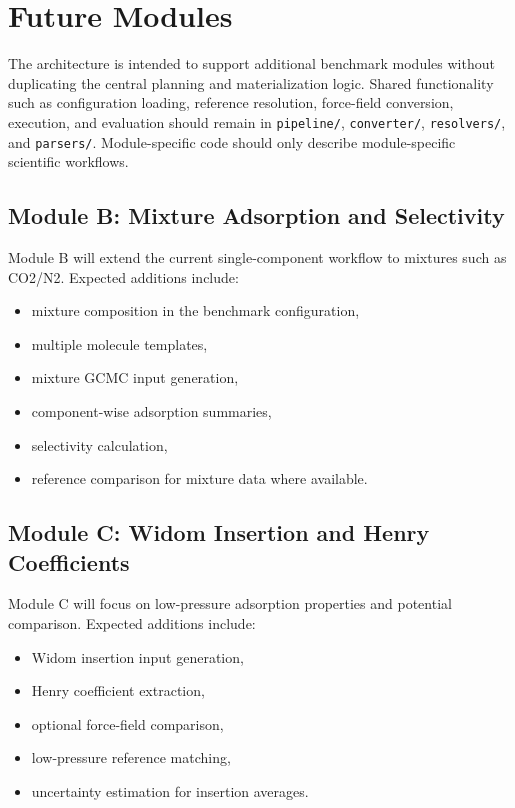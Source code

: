\section{Future Modules}

The architecture is intended to support additional benchmark modules without duplicating the central planning and materialization logic.
Shared functionality such as configuration loading, reference resolution, force-field conversion, execution, and evaluation should remain in \texttt{pipeline/}, \texttt{converter/}, \texttt{resolvers/}, and \texttt{parsers/}.
Module-specific code should only describe module-specific scientific workflows.

\subsection{Module B: Mixture Adsorption and Selectivity}

Module B will extend the current single-component workflow to mixtures such as CO2/N2.
Expected additions include:

\begin{itemize}
    \item mixture composition in the benchmark configuration,
    \item multiple molecule templates,
    \item mixture GCMC input generation,
    \item component-wise adsorption summaries,
    \item selectivity calculation,
    \item reference comparison for mixture data where available.
\end{itemize}

\subsection{Module C: Widom Insertion and Henry Coefficients}

Module C will focus on low-pressure adsorption properties and potential comparison.
Expected additions include:

\begin{itemize}
    \item Widom insertion input generation,
    \item Henry coefficient extraction,
    \item optional force-field comparison,
    \item low-pressure reference matching,
    \item uncertainty estimation for insertion averages.
\end{itemize}

